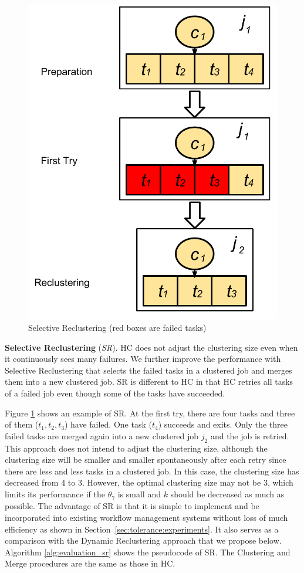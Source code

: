 \begin{figure}[!htb]
\centering
  \includegraphics[width=0.35\linewidth]{figures/tolerance/sr.pdf}
  \caption{Selective Reclustering (red boxes are failed tasks)}
  \label{fig:clustering_sr}
\end{figure}

\textbf{Selective Reclustering} (\emph{SR}). HC does not adjust the clustering size even when it continuously sees many failures. We further improve the performance with Selective Reclustering that selects the failed tasks in a clustered job and merges them into a new clustered job. SR is different to HC in that HC retries all tasks of a failed job even though some of the tasks have succeeded. 

Figure \ref{fig:clustering_sr} shows an example of SR. At the first try, there are four tasks and three of them ($t_1, t_2, t_3$) have failed. One task ($t_4$) succeeds and exits. Only the three failed tasks are merged again into a new clustered job $j_2$ and the job is retried. This approach does not intend to adjust the clustering size, although the clustering size will be smaller and smaller spontaneously after each retry since there are less and less tasks in a clustered job. In this case, the clustering size has decreased from 4 to 3. However, the optimal clustering size may not be 3, which limits its performance if the $\theta_{\gamma}$ is small and $k$ should be decreased as much as possible. The advantage of SR is that it is simple to implement and be incorporated into existing workflow management systems without loss of much efficiency as shown in Section~\ref{sec:tolerance:experiments}. It also serves as a comparison with the Dynamic Reclustering approach that we propose below. Algorithm \ref{alg:evaluation_sr} shows the pseudocode of SR. The Clustering and Merge procedures are the same as those in HC. 

